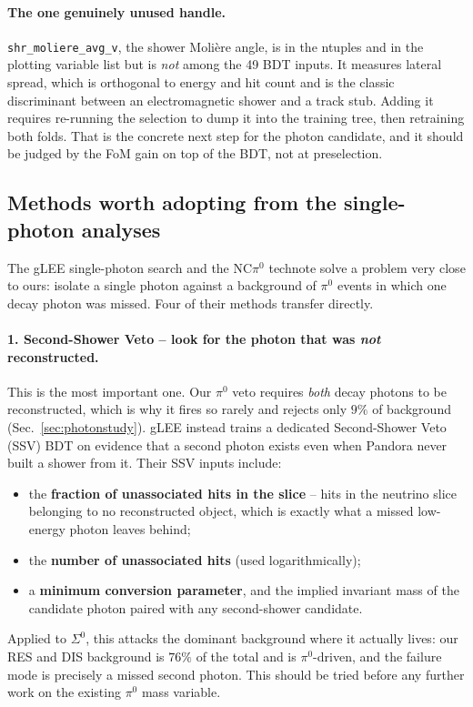 \documentclass[11pt,a4paper]{article}
\newcommand{\Szero}{\ensuremath{\Sigma^{0}}}
\begin{document}
\paragraph{The one genuinely unused handle.} \texttt{shr\_moliere\_avg\_v}, the
shower Moli\`ere angle, is in the ntuples and in the plotting variable list but is
\emph{not} among the 49 BDT inputs. It measures lateral spread, which is
orthogonal to energy and hit count and is the classic discriminant between an
electromagnetic shower and a track stub. Adding it requires re-running the
selection to dump it into the training tree, then retraining both folds. That is
the concrete next step for the photon candidate, and it should be judged by the
FoM gain on top of the BDT, not at preselection.

\subsection{Methods worth adopting from the single-photon analyses}
\label{sec:glee}

The gLEE single-photon search and the NC$\pi^0$ technote solve a problem very close
to ours: isolate a single photon against a background of $\pi^0$ events in which one
decay photon was missed. Four of their methods transfer directly.

\paragraph{1. Second-Shower Veto -- look for the photon that was \emph{not}
reconstructed.} This is the most important one. Our $\pi^0$ veto requires
\emph{both} decay photons to be reconstructed, which is why it fires so rarely and
rejects only $9\%$ of background (Sec.~\ref{sec:photonstudy}). gLEE instead trains a
dedicated Second-Shower Veto (SSV) BDT on evidence that a second photon exists even
when Pandora never built a shower from it. Their SSV inputs include:
\begin{itemize}
  \item the \textbf{fraction of unassociated hits in the slice} -- hits in the
        neutrino slice belonging to no reconstructed object, which is exactly what a
        missed low-energy photon leaves behind;
  \item the \textbf{number of unassociated hits} (used logarithmically);
  \item a \textbf{minimum conversion parameter}, and the implied invariant mass of
        the candidate photon paired with any second-shower candidate.
\end{itemize}
Applied to \Szero, this attacks the dominant background where it actually lives: our
RES and DIS background is $76\%$ of the total and is $\pi^0$-driven, and the failure
mode is precisely a missed second photon. This should be tried before any further
work on the existing $\pi^0$ mass variable.
\end{document}
